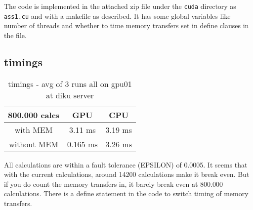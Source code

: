 \documentclass[a4paper,10pt]{article}
\begin{document}
The code is implemented in the attached zip file under the \texttt{cuda} directory as \texttt{ass1.cu} and with a makefile as described.
It has some global variables like number of threads and whether to time memory transfers set in define clauses in the file.

\subsection{timings}

\begin{table}[ht]
\caption{timings - avg of 3 runs all on gpu01 at diku server}
\centering
\begin{tabular}{c|c|c}
 800.000 calcs & GPU & CPU \\
\hline with MEM & 3.11 ms & 3.19 ms\\
\hline without MEM & 0.165 ms & 3.26 ms
\end{tabular}
\end{table}
All calculations are within a fault tolerance (EPSILON) of 0.0005.
It seems that with the current calculations, around 14200 calculations make it break even. 
But if you do count the memory transfers in, it barely break even at 800.000 calculations.
There is a define statement in the code to switch timing of memory transfers.
\end{document}
